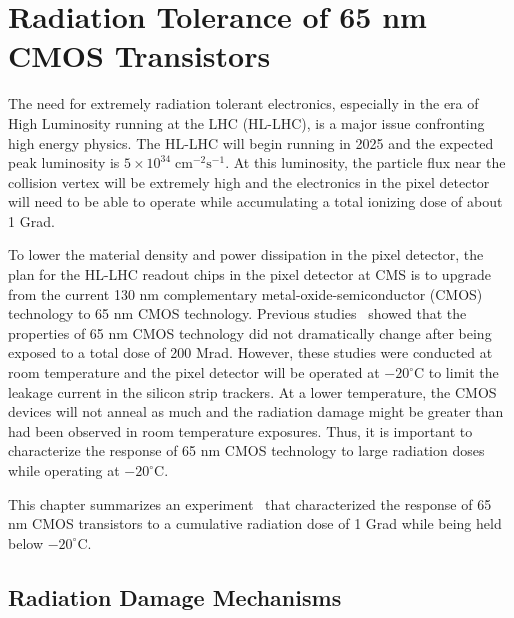 \chapter{Radiation Tolerance of 65 nm CMOS Transistors}
\label{ch:RadStudies}

The need for extremely radiation tolerant electronics, especially in the era of High Luminosity running at the LHC (HL-LHC), is a major issue confronting high energy physics. The HL-LHC will begin running in 2025 and the expected peak luminosity is $5\times10^{34}\; \mathrm{cm}^{-2}\mathrm{s}^{-1}$. At this luminosity, the particle flux near the collision vertex will be extremely high and the electronics in the pixel detector will need to be able to operate while accumulating a total ionizing dose of about 1 Grad. 

To lower the material density and power dissipation in the pixel detector, the plan for the HL-LHC readout chips in the pixel detector at CMS is to upgrade from the current 130 nm complementary metal-oxide-semiconductor (CMOS) technology to 65 nm CMOS technology. Previous studies~\cite{CMOSXrayRadiation} showed that the properties of 65 nm CMOS technology did not dramatically change after being exposed to a total dose of 200 Mrad. However, these studies were conducted at room temperature and the pixel detector will be operated at $-20^{\circ}\mathrm{C}$ to limit the leakage current in the silicon strip trackers. At a lower temperature, the CMOS devices will not anneal as much and the radiation damage might be greater than had been observed in room temperature exposures. Thus, it is important to characterize the response of 65 nm CMOS technology to large radiation doses while operating at $-20^{\circ}\mathrm{C}$.

This chapter summarizes an experiment~\cite{CMOSRadiation} that characterized the response of 65 nm CMOS transistors to a cumulative radiation dose of 1 Grad while being held below $-20^{\circ}\mathrm{C}$.

\section{Radiation Damage Mechanisms}

